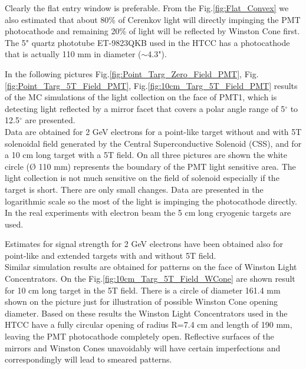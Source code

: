 Clearly the flat entry window is preferable. From the Fig.\ref{fig:Flat_Convex} we also estimated that about 80\% of Cerenkov light will directly impinging the PMT photocathode and remaining 20\% of light will be reflected by Winston Cone first. The 5" quartz phototube ET-9823QKB used in the HTCC has a photocathode that is actually 110 mm in diameter ($\sim$4.3"). 

In the following pictures Fig.\ref{fig:Point_Targ_Zero_Field_PMT}, Fig.\ref{fig:Point_Targ_5T_Field_PMT}, Fig.\ref{fig:10cm_Targ_5T_Field_PMT} results of the MC simulations of the light collection on the face of PMT1, which is detecting light reflected by a mirror facet that covers a polar angle range of 5$^\circ$ to 12.5$^\circ$ are presented. \\
\indent Data are obtained for 2 GeV electrons for a point-like target without and with 5T solenoidal field generated by the Central Superconductive Solenoid (CSS), and for a 10 cm long target with a 5T field. On all three pictures are shown the white circle (Ø 110 mm) represents the boundary of the PMT light sensitive area. The light collection is not much sensitive on the field of solenoid especially if the target is short. There are only small changes. Data are presented in the logarithmic scale so the most of the light is impinging the photocathode directly. 
In the real experiments with electron beam the 5 cm long cryogenic targets are used. 

Estimates for signal strength for 2 GeV electrons have been obtained also for point-like and extended targets with and without 5T field. \\
\indent Similar simulation results are obtained for patterns on the face of Winston Light Concentrators. On the Fig.\ref{fig:10cm_Targ_5T_Field_WCone} are shown result for 10 cm long target in the 5T field. There is a circle of diameter 161.4 mm shown on the picture just for illustration of possible Winston Cone opening diameter. Based on these results the Winston Light Concentrators used in the HTCC have a fully circular opening of radius R=7.4 cm and length of 190 mm, leaving the PMT photocathode completely open. Reflective surfaces of the mirrors and Winston Cones unavoidably will have certain imperfections and correspondingly will lead to smeared patterns. 

